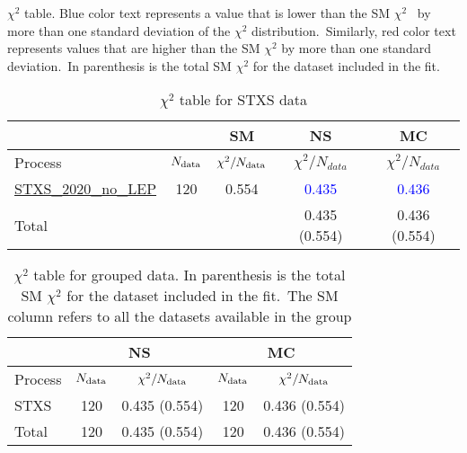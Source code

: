 \documentclass{article}
\begin{document}
$\chi^2$ table. Blue color text represents a value that is lower than the SM $\chi^2$ \
            by more than one standard deviation of the $\chi^2$ distribution.\
            Similarly, red color text represents values that are higher than the SM $\chi^2$ by more than one standard deviation.\
            In parenthesis is the total SM $\chi^2$ for the dataset included in the fit. \\
\begin{table}[H]
\centering
\begin{tabular}{|l|c|c|c|c|}
\hline
 \multicolumn{2}{|c|}{} & SM& NS& MC\\ \hline
Process & $N_{\rm data}$ & $\chi^ 2/N_{\rm data}$& $\chi^ 2/N_{data}$& $\chi^ 2/N_{data}$\\ \hline
\href{https://arxiv.org/abs/1302.3415}{STXS_2020_no_LEP} & 120 & 0.554 & \textcolor{blue}{0.435} & \textcolor{blue}{0.436} \\ \hline
\hline Total & &  & 0.435 (0.554) & 0.436 (0.554) \\ \hline
\end{tabular}
\caption{$\chi^2$ table for STXS data}
\end{table}




\begin{table}[H]
\centering
\begin{tabular}{|l|c|c|c|c|}
\hline
& \multicolumn{2}{c|}{NS} & \multicolumn{2}{c|}{MC} \\ \hline
Process  & $N_{\rm data}$ & $\chi^2/N_{\rm data}$ & $N_{\rm data}$ & $\chi^2/N_{\rm data}$\\ \hline
STXS & 120 & 0.435 (0.554) & 120 & 0.436 (0.554) \\ \hline
 \hline Total & 120 & 0.435 (0.554) & 120 & 0.436 (0.554) \\ \hline
\end{tabular}
\caption{$\chi^2$ table for grouped data. In parenthesis is the total SM $\chi^2$ for the dataset included in the fit.\
                    The SM column refers to all the datasets available in the group}
\end{table}
\end{document}
